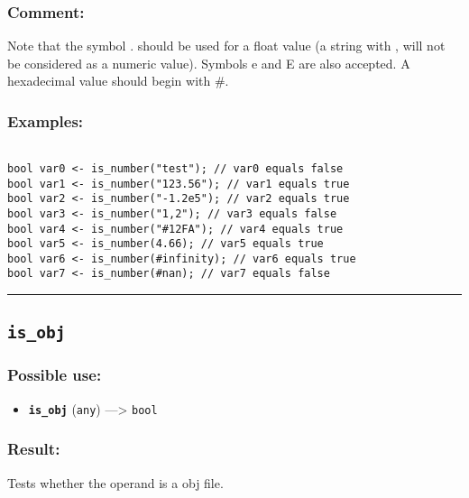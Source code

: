 \documentclass[]{book}
\providecommand{\tightlist}{%
  \setlength{\itemsep}{0pt}\setlength{\parskip}{0pt}}
\theoremstyle{definition}
\theoremstyle{definition}
\theoremstyle{definition}
\theoremstyle{remark}
\begin{document}
\subsubsection{Comment:}\label{comment-55}

Note that the symbol . should be used for a float value (a string with ,
will not be considered as a numeric value). Symbols e and E are also
accepted. A hexadecimal value should begin with \#.

\subsubsection{Examples:}\label{examples-216}

\begin{verbatim}
 
bool var0 <- is_number("test"); // var0 equals false 
bool var1 <- is_number("123.56"); // var1 equals true 
bool var2 <- is_number("-1.2e5"); // var2 equals true 
bool var3 <- is_number("1,2"); // var3 equals false 
bool var4 <- is_number("#12FA"); // var4 equals true 
bool var5 <- is_number(4.66); // var5 equals true 
bool var6 <- is_number(#infinity); // var6 equals true 
bool var7 <- is_number(#nan); // var7 equals false
\end{verbatim}

\begin{center}\rule{0.5\linewidth}{\linethickness}\end{center}

\subsection{\texorpdfstring{\texttt{is\_obj}}{is\_obj}}\label{is_obj}

\subsubsection{Possible use:}\label{possible-use-297}

\begin{itemize}
\tightlist
\item
  \textbf{\texttt{is\_obj}} (\texttt{any}) ---\textgreater{}
  \texttt{bool}
\end{itemize}

\subsubsection{Result:}\label{result-287}

Tests whether the operand is a obj file.
\end{document}
